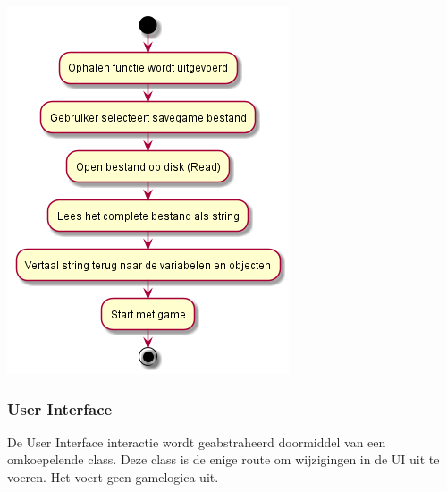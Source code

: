 \documentclass[a4paper,titlepage,11pt]{article}
\begin{document}
\begin{center}
\includegraphics[width=.5\linewidth]{../Images/serialization2.png}
\end{center}

\subsubsection{User Interface}

De User Interface interactie wordt geabstraheerd doormiddel van een omkoepelende class.
Deze class is de enige route om wijzigingen in de UI uit te voeren.
Het voert geen gamelogica uit.
\end{document}
